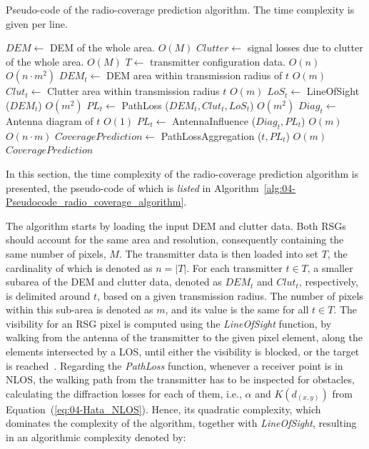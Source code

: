 \begin{algorithm}
\centering

\caption{Pseudo-code of the radio-coverage prediction algorithm. The time complexity
is given per line.\label{alg:04-Pseudocode_radio_coverage_algorithm}}


\begin{algorithmic}
\State $DEM \gets$ DEM of the whole area.
\Comment $O(M)$
\State $Clutter \gets$ signal losses due to clutter of the whole area.
\Comment $O(M)$
\State $T \gets$ transmitter configuration data.
\Comment $O(n)$
	\Comment $O(n \cdot m^2)$
	\State $DEM_{t} \gets $ DEM area within transmission radius of ${t}$
	\Comment $O(m)$
	\State $Clut_{t} \gets $ Clutter area within transmission radius ${t}$
	\Comment $O(m)$
	\State $LoS_{t} \gets$ LineOfSight ($DEM_{t}$)
	\Comment $O(m^2)$
	\State $PL_{t} \gets$ PathLoss ($DEM_{t}, Clut_{t}, LoS_{t}$)
	\Comment $O(m^2)$
	\State $Diag_{t} \gets $ Antenna diagram of ${t}$ 
	\Comment $O(1)$
	\State $PL_{t} \gets$ AntennaInfluence ($Diag_{t}, PL_{t}$)
	\Comment $O(m)$
\EndFor
{}
	\Comment $O(n \cdot m)$
	\State $CoveragePrediction \gets$ PathLossAggregation ($t, PL_{t}$)
	\Comment $O(m)$
\EndFor
\State \Return $CoveragePrediction$
\end{algorithmic}
\end{algorithm}


In this section, the time complexity of the radio-coverage prediction
algorithm is presented, the pseudo-code of which is \textit{\emph{listed}}
in Algorithm~\ref{alg:04-Pseudocode_radio_coverage_algorithm}.

The algorithm starts by loading the input DEM and clutter data. Both
RSGs should account for the same area and resolution, consequently
containing the same number of pixels, $M$. The transmitter data is
then loaded into set $T$, the cardinality of which is denoted as
$n=|T|$. For each transmitter $t\in T$, a smaller subarea of the
DEM and clutter data, denoted as $DEM_{t}$ and $Clut_{t}$, respectively,
is delimited around $t$, based on a given transmission radius. The
number of pixels within this sub-area is denoted as $m$, and its
value is the same for all $t\in T$. The visibility for an RSG pixel
is computed using the \emph{LineOfSight} function, by walking from
the antenna of the transmitter to the given pixel element, along the
elements intersected by a LOS, until either the visibility is blocked,
or the target is reached~\cite{DeFloriani-Applications_of_computational_geometry_to_geographic_information_systems:1999}.
Regarding the \emph{PathLoss }function, whenever a receiver point
is in NLOS, the walking path from the transmitter has to be inspected
for obstacles, calculating the diffraction losses for each of them,
i.e., $\alpha$ and $K(d_{(x,y)})$ from Equation~(\ref{eq:04-Hata_NLOS}).
Hence, its quadratic complexity, which dominates the complexity of
the algorithm, together with \emph{LineOfSight}, resulting in an algorithmic
complexity denoted by:


